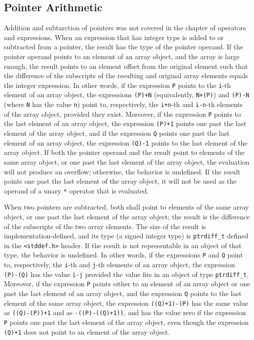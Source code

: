 \subsection{Pointer Arithmetic}
Addition and subtarction of pointers was not covered in the chapter of
operators and 
expressions. When an expression that has integer type is added to or subtracted
from a pointer, the result has the type of the pointer operand. If the pointer
operand points to an element of an array object, and the array is large enough,
the result points to an element offset from the original element such that the
difference of the subscripts of the resulting and original array elements
equals the integer expression. In other words, if the expression \texttt{P}
points to the \texttt{i}-th element of an array object, the expressions
\texttt{(P)+N} (equivalently, \texttt{N+(P)}) and \texttt{(P)-N} (where
\texttt{N} has the value \texttt{n}) point to, respectively, the
\texttt{i+n}-th and \texttt{i-n}-th elements of the array object, provided they
exist. Moreover, if the expression \texttt{P} points to the last element of an
array object, the expression \texttt{(P)+1} points one past the last element of
the array object, and if the expression \texttt{Q} points one past the last
element of an array object, the expression \texttt{(Q)-1} points to the last
element of the array object. If both the pointer operand and the result point
to elements of the same array object, or one past the last element of the array
object, the evaluation will not produce an overflow; otherwise, the behavior is
undefined. If the result points one past the last element of the array object,
it will not be used as the operand of a unary \texttt{*} operator that is
evaluated.

When two pointers are subtracted, both shall point to elements of the same
array object, or one past the last element of the array object; the result is
the difference of the subscripts of the two array elements. The size of the
result is implementation-defined, and its type (a signed integer type) is
\texttt{ptrdiff\_t} defined in the \texttt{\textless stddef.h\textgreater}
header. If the result is not representable in an object of that type, the
behavior is undefined. In other words, if the expressions \texttt{P} and
\texttt{Q} point to, respectively, the \texttt{i}-th and \texttt{j}-th elements
of an array object, the expression \texttt{(P)-(Q)} has the value \texttt{i-j}
provided the value fits in an object of type \texttt{ptrdiff\_t}. Moreover, if
the expression \texttt{P} points either to an element of an array object or one
past the last element of an array object, and the expression \texttt{Q} points
to the last element of the same array object, the expression
\texttt{((Q)+1)-(P)} has the same value as \texttt{((Q)-(P))+1} and as
\texttt{-((P)-((Q)+1))}, and has the value zero if the expression \texttt{P}
points one past the last element of the array object, even though the
expression \texttt{(Q)+1} does not point to an element of the array object.

